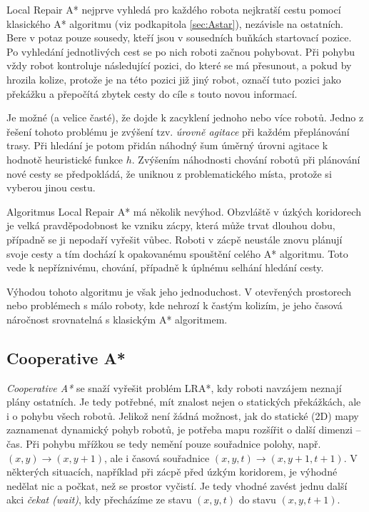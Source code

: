 Local Repair A* nejprve vyhledá pro každého robota nejkratší cestu pomocí klasického A* algoritmu (viz podkapitola \ref{sec:Astar}), nezávisle na ostatních. Bere v potaz pouze sousedy, kteří jsou v sousedních buňkách startovací pozice. Po vyhledání jednotlivých cest se po nich roboti začnou pohybovat. Při pohybu vždy robot kontroluje následující pozici, do které se má přesunout, a pokud by hrozila kolize, protože je na této pozici již jiný robot, označí tuto pozici jako překážku a přepočítá zbytek cesty do cíle s touto novou informací.


Je možné (a velice časté), že dojde k zacyklení jednoho nebo více robotů. Jedno z řešení tohoto problému je zvýšení tzv. \emph{úrovně agitace} při každém přeplánování trasy. Při hledání je potom přidán náhodný šum úměrný úrovni agitace k hodnotě heuristické funkce $h$. Zvýšením náhodnosti chování robotů při plánování nové cesty se předpokládá, že uniknou z problematického místa, protože si vyberou jinou cestu.

Algoritmus Local Repair A* má několik nevýhod. Obzvláště v úzkých koridorech je velká pravděpodobnost ke vzniku zácpy, která může trvat dlouhou dobu, případně se ji nepodaří vyřešit vůbec. Roboti v zácpě neustále znovu plánují svoje cesty a tím dochází k opakovanému spouštění celého A* algoritmu. Toto vede k nepříznivému,  chování, případně k úplnému selhání hledání cesty.

Výhodou tohoto algoritmu je však jeho jednoduchost. V otevřených prostorech nebo problémech s málo roboty, kde nehrozí k častým kolizím, je jeho časová náročnost srovnatelná s klasickým A* algoritmem.


\subsection{Cooperative A*}\label{sec:Coop}
\emph{Cooperative A*} se snaží vyřešit problém LRA*, kdy roboti navzájem neznají plány ostatních. Je tedy potřebné, mít znalost nejen o statických překážkách, ale i o pohybu všech robotů. Jelikož není žádná možnost, jak do statické (2D) mapy zaznamenat dynamický pohyb robotů, je potřeba mapu rozšířit o další dimenzi -- čas. Při pohybu mřížkou se tedy nemění pouze souřadnice polohy, např. $\left(x,y\right)\to\left(x,y+1\right)$, ale i časová souřadnice $\left(x,y,t\right)\to\left(x,y+1,t+1\right)$. V některých situacích, například při zácpě před úzkým koridorem, je výhodné nedělat nic a počkat, než se prostor vyčistí. Je tedy vhodné zavést jednu další akci \emph{čekat (wait)}, kdy přecházíme ze stavu $\left(x,y,t\right)$ do stavu $\left(x,y,t+1\right)$.

